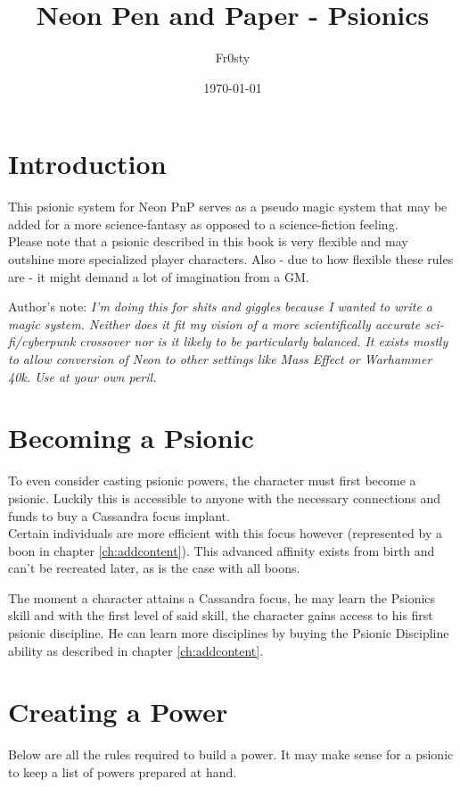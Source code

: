 \documentclass[12pt,a4paper,openany]{book}
\title{Neon Pen and Paper - Psionics}
\author{Fr0sty}
\date{\today}
\begin{document}
	\maketitle
	\tableofcontents
	
	\chapter{Introduction}
	This psionic system for Neon PnP serves as a pseudo magic system that may be added for a more science-fantasy as opposed to a science-fiction feeling.\\
	Please note that a psionic described in this book is very flexible and may outshine more specialized player characters. Also - due to how flexible these rules are - it might demand a lot of imagination from a GM.
	
	Author's note: \emph{I'm doing this for shits and giggles because I wanted to write a magic system. Neither does it fit my vision of a more scientifically accurate sci-fi/cyberpunk crossover nor is it likely to be particularly balanced. It exists mostly to allow conversion of Neon to other settings like Mass Effect or Warhammer 40k. Use at your own peril.}
	
	\chapter{Becoming a Psionic}
	To even consider casting psionic powers, the character must first become a psionic. Luckily this is accessible to anyone with the necessary connections and funds to buy a Cassandra focus implant.\\
	Certain individuals are more efficient with this focus however (represented by a boon in chapter \ref{ch:addcontent}). This advanced affinity exists from birth and can't be recreated later, as is the case with all boons. \par
	The moment a character attains a Cassandra focus, he may learn the Psionics skill and with the first level of said skill, the character gains access to his first psionic discipline. He can learn more disciplines by buying the Psionic Discipline ability as described in chapter \ref{ch:addcontent}.
	
	\chapter{Creating a Power}
	\label{ch:create}
	Below are all the rules required to build a power. It may make sense for a psionic to keep a list of powers prepared at hand.
\end{document}
